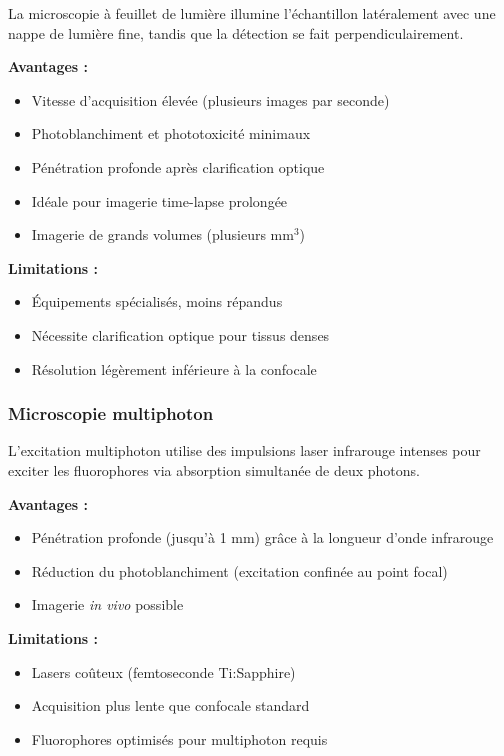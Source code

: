 La microscopie à feuillet de lumière illumine l'échantillon latéralement avec une nappe de lumière fine, tandis que la détection se fait perpendiculairement.

\textbf{Avantages :}
\begin{itemize}
    \item Vitesse d'acquisition élevée (plusieurs images par seconde)
    \item Photoblanchiment et phototoxicité minimaux
    \item Pénétration profonde après clarification optique
    \item Idéale pour imagerie time-lapse prolongée
    \item Imagerie de grands volumes (plusieurs mm$^3$)
\end{itemize}

\textbf{Limitations :}
\begin{itemize}
    \item Équipements spécialisés, moins répandus
    \item Nécessite clarification optique pour tissus denses
    \item Résolution légèrement inférieure à la confocale
\end{itemize}

\subsubsection{Microscopie multiphoton}

L'excitation multiphoton utilise des impulsions laser infrarouge intenses pour exciter les fluorophores via absorption simultanée de deux photons.

\textbf{Avantages :}
\begin{itemize}
    \item Pénétration profonde (jusqu'à 1 mm) grâce à la longueur d'onde infrarouge
    \item Réduction du photoblanchiment (excitation confinée au point focal)
    \item Imagerie \textit{in vivo} possible
\end{itemize}

\textbf{Limitations :}
\begin{itemize}
    \item Lasers coûteux (femtoseconde Ti:Sapphire)
    \item Acquisition plus lente que confocale standard
    \item Fluorophores optimisés pour multiphoton requis
\end{itemize}

